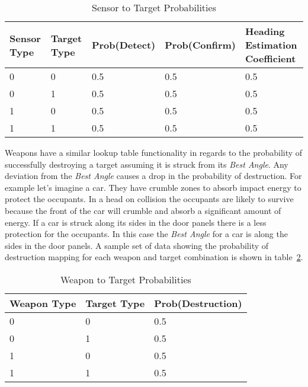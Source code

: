 \begin{table}[h]
	\caption{Sensor to Target Probabilities}
	\centering
	\label{tab:snsrTgtProb}
	\begin{tabular}{|p{1cm}|p{1cm}|p{1cm}|p{1cm}|p{1cm}|}
		\hline
		Sensor Type & Target Type & Prob(Detect) & Prob(Confirm) & Heading Estimation Coefficient\\ \hline
		0 & 0 & 0.5 & 0.5 & 0.5 \\
		0 & 1 & 0.5 & 0.5 & 0.5 \\
		1 & 0 & 0.5 & 0.5 & 0.5 \\
		1 & 1 & 0.5 & 0.5 & 0.5 \\
		\hline
	\end{tabular}
\end{table}

Weapons have a similar lookup table functionality in regards to the probability of successfully destroying a target assuming it is struck from its \textit{Best Angle}.  Any deviation from the \textit{Best Angle} causes a drop in the probability of destruction.  For example let's imagine a car.  They have crumble zones to absorb impact energy to protect the occupants.  In a head on collision the occupants are likely to survive because the front of the car will crumble and absorb a significant amount of energy.  If a car is struck along its sides in the door panels there is a less protection for the occupants.  In this case the \textit{Best Angle} for a car is along the sides in the door panels. A sample set of data showing the probability of destruction mapping for each weapon and target combination is shown in table~\ref{tab:wpnTgtProb}.

\begin{table}[h]
	\caption{Weapon to Target Probabilities}
	\centering
	\label{tab:wpnTgtProb}
	\begin{tabular}{|p{1.5cm}|p{1.5cm}|p{3cm}|}
		\hline
		Weapon Type & Target Type & Prob(Destruction)\\ \hline
		0 & 0 & 0.5 \\
		0 & 1 & 0.5 \\
		1 & 0 & 0.5 \\
		1 & 1 & 0.5 \\
		\hline
	\end{tabular}
\end{table}




